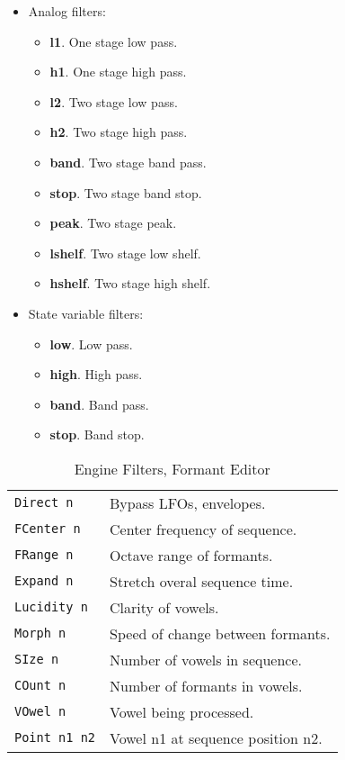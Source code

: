    \begin{itemize}
      \item Analog filters:
      \begin{itemize}
          \item \textbf{l1}. One stage low pass.
          \item \textbf{h1}. One stage high pass.
          \item \textbf{l2}. Two stage low pass.
          \item \textbf{h2}. Two stage high pass.
          \item \textbf{band}. Two stage band pass.
          \item \textbf{stop}. Two stage band stop.
          \item \textbf{peak}. Two stage peak.
          \item \textbf{lshelf}. Two stage low shelf.
          \item \textbf{hshelf}. Two stage high shelf.
      \end{itemize}
      \item State variable filters:
      \begin{itemize}
         \item \textbf{low}. Low pass.
         \item \textbf{high}. High pass.
         \item \textbf{band}. Band pass.
         \item \textbf{stop}. Band stop.
      \end{itemize}
   \end{itemize}

   \begin{table}[H]
      \centering
      \caption{Engine Filters, Formant Editor}
      \label{table:yoshimi_engine_filters_formant_editor}
      \begin{tabular}{l l}

\texttt{Direct n} &
   Bypass LFOs, envelopes. \\
\texttt{FCenter n} &
   Center frequency of sequence. \\
\texttt{FRange n} &
   Octave range of formants. \\
\texttt{Expand n} &
   Stretch overal sequence time. \\
\texttt{Lucidity n} &
   Clarity of vowels. \\
\texttt{Morph n} &
   Speed of change between formants. \\
\texttt{SIze n} &
   Number of vowels in sequence. \\
\texttt{COunt n} &
   Number of formants in vowels. \\
\texttt{VOwel n} &
   Vowel being processed. \\
\texttt{Point n1 n2} &
   Vowel n1 at sequence position n2. \\

      \end{tabular}
   \end{table}

